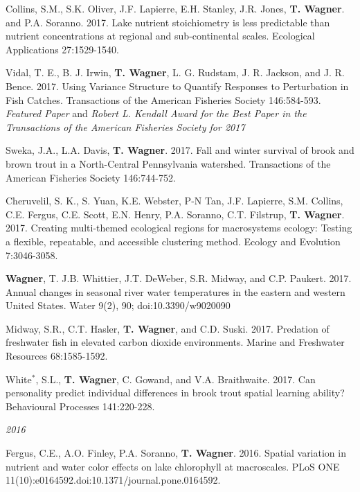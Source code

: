 \documentclass[10pt]{article}
\begin{document}
\begin{flushleft}
\begin{etaremune}[start=68]
\item Collins, S.M., S.K. Oliver, J.F. Lapierre, E.H. Stanley, J.R. Jones, {\bf T. Wagner}. and P.A. Soranno. 2017. Lake nutrient stoichiometry is less predictable than nutrient concentrations at regional and sub-continental scales. Ecological Applications 27:1529-1540.

\item Vidal, T. E., B. J. Irwin, {\bf T. Wagner}, L. G. Rudstam, J. R. Jackson, and J. R. Bence. 2017. Using Variance Structure to Quantify Responses to Perturbation in Fish Catches. Transactions of the American Fisheries Society 146:584-593. \emph{Featured Paper} and \emph{Robert L. Kendall Award for the Best Paper in the Transactions of the American Fisheries Society for 2017}

\item Sweka, J.A., L.A. Davis, {\bf T. Wagner}. 2017. Fall and winter survival of brook and brown trout in a North-Central Pennsylvania watershed. Transactions of the American Fisheries Society 146:744-752.

\item Cheruvelil, S. K., S. Yuan, K.E. Webster, P-N Tan, J.F. Lapierre, S.M. Collins, C.E. Fergus, C.E. Scott, E.N. Henry, P.A. Soranno, C.T. Filstrup, {\bf T. Wagner}. 2017. Creating multi-themed ecological regions for macrosystems ecology: Testing a flexible, repeatable, and accessible clustering method. Ecology and Evolution 7:3046-3058.

\item {\bf Wagner}, T. J.B. Whittier, J.T. DeWeber, S.R. Midway, and C.P. Paukert. 2017. Annual changes in seasonal river water temperatures in the eastern and western United States. Water 9(2), 90; doi:10.3390/w9020090

\item Midway, S.R., C.T. Hasler, {\bf T. Wagner}, and C.D. Suski. 2017. Predation of freshwater fish in elevated carbon dioxide environments. Marine and Freshwater Resources 68:1585-1592.

\item White$^*$, S.L., {\bf T. Wagner}, C. Gowand, and V.A. Braithwaite. 2017. Can personality predict individual differences in brook trout spatial learning ability? Behavioural Processes 141:220-228. 

\end{etaremune}
\emph{2016}
\begin{etaremune}[start=55]

\item Fergus, C.E., A.O. Finley, P.A. Soranno, {\bf T. Wagner}. 2016. Spatial variation in nutrient and water color effects on lake chlorophyll at macroscales. PLoS ONE 11(10):e0164592.doi:10.1371/journal.pone.0164592.


\end{etaremune}
\end{flushleft}
\end{document}
